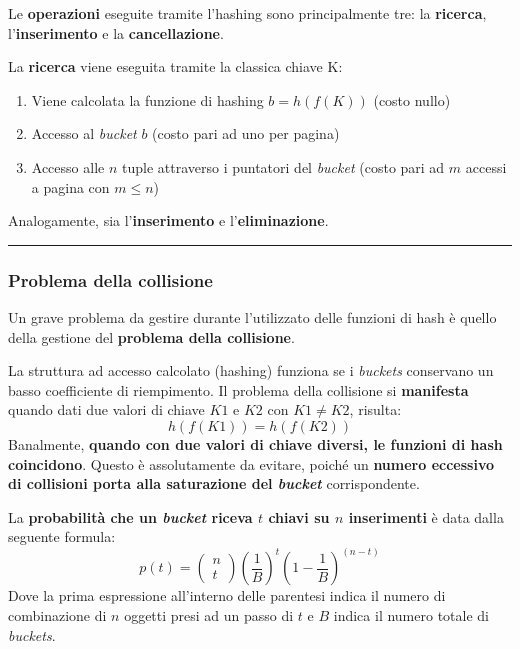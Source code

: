 \documentclass[a4paper]{article}
\newcommand{\longline}{\noindent\rule{\textwidth}{0.4pt}}
\begin{document}
	Le \textbf{operazioni} eseguite tramite l'hashing sono principalmente tre: la \textbf{ricerca}, l'\textbf{inserimento} e la \textbf{cancellazione}.\newline
	
	\noindent
	La \textcolor{Red3}{\textbf{ricerca}} viene eseguita tramite la classica chiave K:
	\begin{enumerate}
		\item Viene calcolata la funzione di hashing $b = h\left(f\left(K\right)\right)$ (costo nullo)
		\item Accesso al \emph{bucket} $b$ (costo pari ad uno per pagina)
		\item Accesso alle $n$ tuple attraverso i puntatori del \emph{bucket} (costo pari ad $m$ accessi a pagina con $m \le n$)
	\end{enumerate}
	Analogamente, sia l'\textcolor{Red3}{\textbf{inserimento}} e l'\textcolor{Red3}{\textbf{eliminazione}}.
		
	\longline
	
	\subsubsection{Problema della collisione}
	
	Un grave problema da gestire durante l'utilizzato delle funzioni di hash è quello della gestione del \textcolor{Red3}{\textbf{problema della collisione}}.\newline
	
	\noindent
	La struttura ad accesso calcolato (hashing) funziona se i \emph{buckets} conservano un basso coefficiente di riempimento. Il problema della collisione si \textbf{manifesta} quando dati due valori di chiave $K1$ e $K2$ con $K1 \ne K2$, risulta:
	\begin{equation*}
		h\left(f\left(K1\right)\right) = h\left(f\left(K2\right)\right)
	\end{equation*}
	Banalmente, \textbf{quando con due valori di chiave diversi, le funzioni di hash coincidono}. Questo è assolutamente da evitare, poiché un \textbf{numero eccessivo di collisioni porta alla saturazione del \emph{bucket}} corrispondente.\newline
	
	\noindent
	La \textbf{probabilità che un \emph{bucket} riceva $t$ chiavi su $n$ inserimenti} è data dalla seguente formula:
	\begin{equation*}
		p\left(t\right) =
		\begin{pmatrix}
			n \\
			t
		\end{pmatrix} \left(\dfrac{1}{B}\right)^{t} \left(1 - \dfrac{1}{B}\right)^{\left(n-t\right)}
	\end{equation*}
	Dove la prima espressione all'interno delle parentesi indica il numero di combinazione di $n$ oggetti presi ad un passo di $t$ e $B$ indica il numero totale di \emph{buckets}.\newline
	
\end{document}
